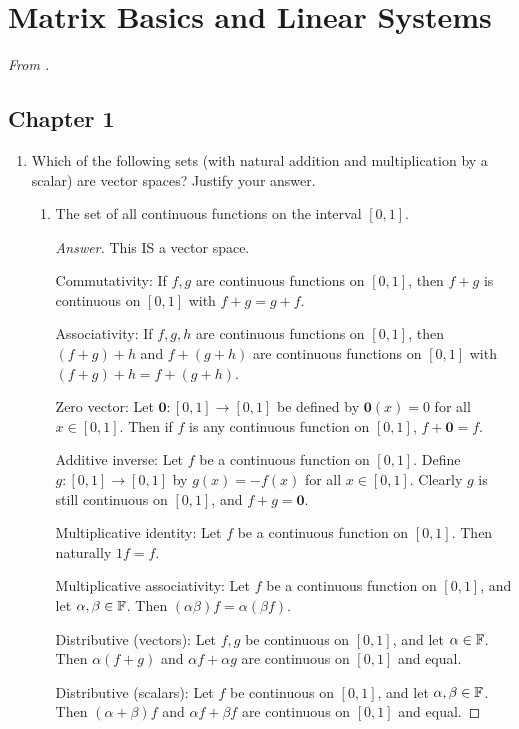 \documentclass[../psets.tex]{subfiles}
\begin{document}
\section{Matrix Basics and Linear Systems}
\emph{From \textcite{bib:Treil}.}
\subsection*{Chapter 1}
\begin{enumerate}[label={\textbf{1.\arabic*.}}]
    \item {}Which of the following sets (with natural addition and multiplication by a scalar) are vector spaces? Justify your answer.
    \begin{enumerate}
        \item The set of all continuous functions on the interval $[0,1]$.
        \begin{proof}[Answer]
            This IS a vector space.\par\smallskip
            Commutativity: If $f,g$ are continuous functions on $[0,1]$, then $f+g$ is continuous on $[0,1]$ with $f+g=g+f$.\par
            Associativity: If $f,g,h$ are continuous functions on $[0,1]$, then $(f+g)+h$ and $f+(g+h)$ are continuous functions on $[0,1]$ with $(f+g)+h=f+(g+h)$.\par
            Zero vector: Let $\bm{0}:[0,1]\to[0,1]$ be defined by $\bm{0}(x)=0$ for all $x\in[0,1]$. Then if $f$ is any continuous function on $[0,1]$, $f+\bm{0}=f$.\par
            Additive inverse: Let $f$ be a continuous function on $[0,1]$. Define $g:[0,1]\to[0,1]$ by $g(x)=-f(x)$ for all $x\in[0,1]$. Clearly $g$ is still continuous on $[0,1]$, and $f+g=\bm{0}$.\par
            Multiplicative identity: Let $f$ be a continuous function on $[0,1]$. Then naturally $1f=f$.\par
            Multiplicative associativity: Let $f$ be a continuous function on $[0,1]$, and let $\alpha,\beta\in\mathbb{F}$. Then $(\alpha\beta)f=\alpha(\beta f)$.\par
            Distributive (vectors): Let $f,g$ be continuous on $[0,1]$, and let $\alpha\in\mathbb{F}$. Then $\alpha(f+g)$ and $\alpha f+\alpha g$ are continuous on $[0,1]$ and equal.\par
            Distributive (scalars): Let $f$ be continuous on $[0,1]$, and let $\alpha,\beta\in\mathbb{F}$. Then $(\alpha+\beta)f$ and $\alpha f+\beta f$ are continuous on $[0,1]$ and equal.

\end{proof}
\end{enumerate}
\end{enumerate}
\end{document}
